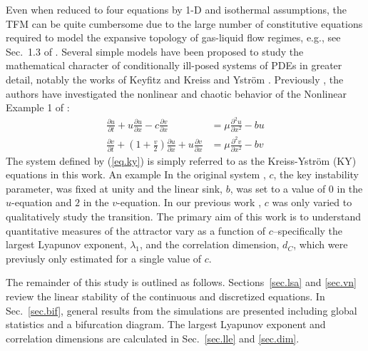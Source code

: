 \documentclass{ws-ijbc}
\newcommand\beqa{\begin{equation}\begin{aligned}}
\newcommand\eeqa{\end{aligned}\end{equation}}
\begin{document}
Even when reduced to four equations by 1-D and isothermal assumptions, the TFM can be quite cumbersome due to the large number of constitutive equations required to model the expansive topology of gas-liquid flow regimes, e.g., see Sec.~1.3 of \cite{ishiihibiki}. Several simple models have been proposed to study the mathematical character of conditionally ill-posed systems of PDEs in greater detail, notably the works of Keyfitz \cite{keyfitz03,keyfitz04} and Kreiss and Ystr\"{o}m \cite{kreiss02}. Previously \citep{fullmer14}, the authors have investigated the nonlinear and chaotic behavior of the Nonlinear Example 1 of \citet{kreiss02}: 
\beqa
\frac{\partial u}{\partial t} + u \frac{\partial u}{\partial x} - c \frac{\partial v}{\partial x} &= \mu \frac{{\partial}^2 u}{\partial x^2} - b u  \\
\frac{\partial v}{\partial t} + \left(1 + \frac{v}{2}\right) \frac{\partial u}{\partial x} + u \frac{\partial v}{\partial x} &= \mu \frac{\partial^2 v}{\partial x^2} - b v 
\label{eq.ky}
\eeqa
The system defined by (\ref{eq.ky}) is simply referred to as the Kreiss-Ystr\"{o}m (KY) equations in this work. An example 
In the original system \citep{kreiss02}, $c$, the key instability parameter, was fixed at unity and the linear sink, $b$, was set to a value of $0$ in the $u$-equation and $2$ in the $v$-equation. In our previous work \citep{fullmer14}, $c$ was only varied to qualitatively study the transition. The primary aim of this work is to understand quantitative measures of the attractor vary as a function of $c$--specifically the largest Lyapunov exponent, $\lambda_1$, and the correlation dimension, $d_C$, which were previusly only estimated for a single value of $c$. 


The remainder of this study is outlined as follows. Sections~\ref{sec.lsa} and \ref{sec.vn} review the linear stability of the continuous and discretized equations. In Sec.~\ref{sec.bif}, general results from the simulations are presented including global statistics and a bifurcation diagram. The largest Lyapunov exponent and correlation dimensions are calculated in Sec.~\ref{sec.lle} and \ref{sec.dim}. 



\end{document}
